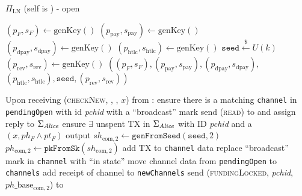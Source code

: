 \begin{protocolbox}{$\Pi_{\mathrm{LN}}$ (self is \alice) - open}
\begin{algorithmic}[1]
     
      \State $\left(p_F, s_F\right) \gets \mathrm{genKey}\left(\right)$
      \State $\left(p_{\mathrm{pay}}, s_{\mathrm{pay}}\right) \gets
      \mathrm{genKey}\left(\right)$ 
      \State $\left(p_{\mathrm{dpay}}, s_{\mathrm{dpay}}\right) \gets
      \mathrm{genKey}\left(\right)$ 
      \State $\left(p_{\mathrm{htlc}}, s_{\mathrm{htlc}}\right) \gets
      \mathrm{genKey}\left(\right)$ 
      \State $\texttt{seed} \overset{\$}{\gets} U(k)$ 
      \State $\left(p_{\mathrm{rev}}, s_{\mathrm{rev}}\right) \gets
      \mathrm{genKey}\left(\right)$ 
      \State \Return $\left(\left(p_F, s_F\right), \left(p_{\mathrm{pay}},
      s_{\mathrm{pay}}\right), \left(p_{\mathrm{dpay}},
      s_{\mathrm{dpay}}\right),\right.$
      \Indent
        \State $\left.\left(p_{\mathrm{htlc}}, s_{\mathrm{htlc}}\right),
        \mathtt{seed}, \left(p_{\mathrm{rev}}, s_{\mathrm{rev}}\right)\right)$
      \EndIndent
    \EndFunction
    \State

    \State {}
    \State Upon receiving (\textsc{checkNew}, \alice, \bob, $x$) from
    \environment: 
    \Indent
      \State ensure there is a matching \texttt{channel} in \texttt{pendingOpen}
      with id \textit{pchid} with a ``broadcast'' mark
      \State send (\textsc{read}) to \ledger{} and assign reply to
      $\Sigma_{\mathit{Alice}}$
      \State ensure $\exists$ unspent TX in $\Sigma_{\mathit{Alice}}$ with ID
      \textit{pchid} and a $\left(x, ph_F \wedge pt_F\right)$ output
      \State $sh_{\mathrm{com}, 2} \gets
      \texttt{genFromSeed}\left(\mathtt{seed}, 2\right)$
      \State $ph_{\mathrm{com}, 2} \gets
      \mathtt{pkFromSk}\left(sh_{\mathrm{com}, 2}\right)$
      \State add TX to \texttt{channel} data \State replace ``broadcast'' mark
      in \texttt{channel} with ``in state''
        \State move channel data from \texttt{pendingOpen} to \texttt{channels}
        \State add receipt of channel to \texttt{newChannels}
      \EndIf
      \State send (\textsc{fundingLocked}, \textit{pchid},
      $ph\_\mathrm{base}_{\mathrm{com}, 2}$) to \bob{}
    \EndIndent
    \State


\end{algorithmic}
\end{protocolbox}
